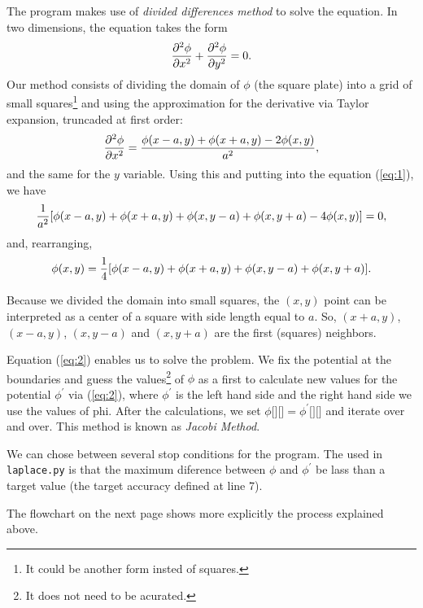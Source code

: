   The program makes use of \textit{divided differences method} to solve the equation. In two dimensions, the equation takes the form
  \begin{equation}
    \pdv[2]{\phi}{x} + \pdv[2]{\phi}{y} = 0.
    \label{eq:1}
  \end{equation}
  Our method consists of dividing the domain of $\phi$ (the square plate) into a grid of small squares\footnote{It could be another form insted of squares.} and using the approximation for the derivative via Taylor expansion, truncaded at first order:
  \begin{equation*}
    \pdv[2]{\phi}{x} (x,y) = \frac{\phi(x - a, y) + \phi(x + a, y) - 2 \phi (x, y)}{a^2},
  \end{equation*}
  and the same for the $y$ variable. Using this and putting into the equation (\ref{eq:1}), we have
  \begin{equation*}
    \frac{1}{a^2} \qty[\phi(x - a, y) + \phi(x + a, y) + \phi(x, y - a) + \phi(x, y + a) - 4 \phi (x, y)] = 0,
  \end{equation*}
  and, rearranging,
  \begin{equation}
    \phi(x,y) = \frac{1}{4} \qty[\phi(x - a, y) + \phi(x + a, y) + \phi(x, y - a) + \phi(x, y + a)].
    \label{eq:2}
  \end{equation}

  Because we divided the domain into small squares, the $(x,y)$ point can be interpreted as a center of a square with side length equal to $a$. So, $(x+a,y)$, $(x-a,y)$, $(x,y-a)$ and $(x, y + a)$ are the first (squares) neighbors.

  Equation (\ref{eq:2}) enables us to solve the problem. We fix the potential at the boundaries and guess the values\footnote{It does not need to be acurated.} of $\phi$ as a first to calculate new values for the potential $\phi^\prime$ via (\ref{eq:2}), where $\phi^\prime$ is the left hand side and the right hand side we use the values of phi. After the calculations, we set $\phi \texttt{[} \texttt{]} \texttt{[} \texttt{]} = \phi^\prime \texttt{[} \texttt{]} \texttt{[} \texttt{]}$ and iterate over and over. This method is known as \textit{Jacobi Method}.

  We can chose between several stop conditions for the program. The used in \texttt{laplace.py} is that the maximum diference between $\phi$ and $\phi^\prime$ be lass than a target value (the target accuracy defined at line 7).

  The flowchart on the next page shows more explicitly the process explained above.

